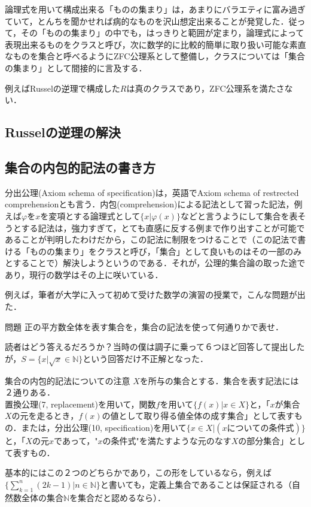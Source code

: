 \documentclass[uplatex, 12pt, a4paper, dvipdfmx]{jsarticle}
\begin{document}
論理式を用いて構成出来る「ものの集まり」は，あまりにバラエティに富み過ぎていて，とんちを聞かせれば病的なものを沢山想定出来ることが発覚した．従って，その「ものの集まり」の中でも，はっきりと範囲が定まり，論理式によって表現出来るものをクラスと呼び，次に数学的に比較的簡単に取り扱い可能な素直なものを集合と呼べるようにZFC公理系として整備し，クラスについては「集合の集まり」として間接的に言及する．\par
例えばRusselの逆理で構成した$R$は真のクラスであり，ZFC公理系を満たさない．

\subsection{Russelの逆理の解決}

\subsection{集合の内包的記法の書き方}
分出公理(Axiom schema of specification)は，英語でAxiom schema of restrected comprehensionとも言う．内包(comprehension)による記法として習った記法，例えば$\varphi$を$x$を変項とする論理式として$\{ x | \varphi (x) \}$などと言うようにして集合を表そうとする記法は，強力すぎて，とても直感に反する例まで作り出すことが可能であることが判明したわけだから，この記法に制限をつけることで（この記法で書ける「ものの集まり」をクラスと呼び，「集合」として良いものはその一部のみとすることで）解決しようというのである．それが，公理的集合論の取った途であり，現行の数学はその上に咲いている．\par
例えば，筆者が大学に入って初めて受けた数学の演習の授業で，こんな問題が出た．

\begin{itembox}[l]{問題}
	正の平方数全体を表す集合を，集合の記法を使って何通りかで表せ．
\end{itembox}
読者はどう答えるだろうか？当時の僕は調子に乗って６つほど回答して提出したが，$S=\{ x | \sqrt{x} \in \mathbb{N} \}$という回答だけ不正解となった．
\begin{itembox}[l]{集合の内包的記法についての注意}
	$X$を所与の集合とする．集合を表す記法には２通りある．\\
	置換公理(7, replacement)を用いて，関数$f$を用いて$\{ f(x) | x\in X \}$と，「$x$が集合$X$の元を走るとき，$f(x)$の値として取り得る値全体の成す集合」として表すもの．または，分出公理(10, specification)を用いて$\{ x\in X | (xについての条件式) \}$と，「$X$の元$x$であって，"$x$の条件式"を満たすような元のなす$X$の部分集合」として表すもの．
\end{itembox}
基本的にはこの２つのどちらかであり，この形をしているなら，例えば$\{ \sum^n_{k=1} (2k-1) | n\in\mathbb{N} \}$と書いても，定義上集合であることは保証される（自然数全体の集合$\mathbb{N}$を集合だと認めるなら）．
\end{document}
